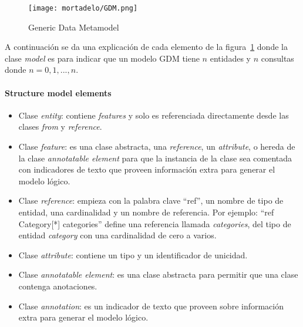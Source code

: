 

\begin{figure}[H] 
    \centering
    \texttt{[image: mortadelo/GDM.png]}
    \caption{Generic Data Metamodel}
    \label{img:mortadelo-gdm}
\end{figure}


A continuación se da una explicación de cada elemento de la figura~\ref{img:mortadelo-gdm} donde la clase \textit{model} es para indicar que un modelo GDM tiene $n$ entidades y $n$ consultas donde $n=0,1,...,n$.


\paragraph*{Structure model elements}


\begin{itemize}    
    
    \item Clase \textit{entity}: contiene \textit{features} y solo es referenciada directamente desde las clases \textit{from} y \textit{reference}.
    \item Clase \textit{feature}: es una clase abstracta, una \textit{reference}, un \textit{attribute}, o hereda de la clase \textit{annotatable element} para que la instancia de la clase sea comentada con indicadores de texto que proveen información extra para generar el modelo lógico. 
    \item Clase \textit{reference}: empieza con la palabra clave ``ref'', un nombre de tipo de entidad, una cardinalidad y un nombre de referencia. Por ejemplo: ``ref Category[*] categories'' define una referencia llamada \textit{categories}, del tipo de entidad \textit{category} con una cardinalidad de cero a varios.
    \item Clase \textit{attribute}: contiene un tipo y un identificador de unicidad.
    \item Clase \textit{annotatable element}: es una clase abstracta para permitir que una clase contenga anotaciones.
    \item Clase \textit{annotation}: es un indicador de texto que proveen sobre información extra para generar el modelo lógico.
    
\end{itemize}

